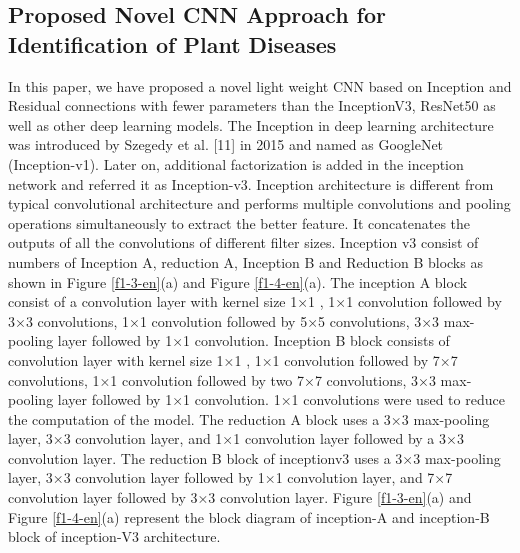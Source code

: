\subsection{Proposed Novel CNN Approach for Identification of Plant Diseases}
In this paper, we have proposed a novel light weight CNN based on Inception and Residual connections with fewer parameters than the InceptionV3, ResNet50 as well as other deep learning models. The Inception in deep learning architecture was introduced by Szegedy et al. [11] in 2015 and named as GoogleNet (Inception-v1). Later on, additional factorization is added in the inception network and referred it as Inception-v3. Inception architecture is different from typical convolutional architecture and performs multiple convolutions and pooling operations simultaneously to extract the better feature. It concatenates the outputs of all the convolutions of different filter sizes. Inception v3 consist of numbers of Inception A, reduction A, Inception B and Reduction B blocks as shown in Figure \ref{f1-3-en}(a) and Figure \ref{f1-4-en}(a). The inception A block consist of a convolution layer with kernel size 1×1 , 1×1 convolution followed by 3×3 convolutions, 1×1 convolution followed by 5×5 convolutions, 3×3 max-pooling layer followed by 1×1 convolution. Inception B block consists of convolution layer with kernel size 1×1 , 1×1 convolution followed by 7×7 convolutions, 1×1 convolution followed by two 7×7 convolutions, 3×3 max-pooling layer followed by 1×1 convolution. 1×1 convolutions were used to reduce the computation of the model. The reduction A block uses a 3×3 max-pooling layer, 3×3 convolution layer, and 1×1 convolution layer followed by a 3×3 convolution layer. The reduction B block of inceptionv3 uses a 3×3 max-pooling layer, 3×3 convolution layer followed by 1×1 convolution layer, and 7×7 convolution layer followed by 3×3 convolution layer. Figure \ref{f1-3-en}(a) and Figure \ref{f1-4-en}(a) represent the block diagram of inception-A and inception-B block of inception-V3 architecture.



